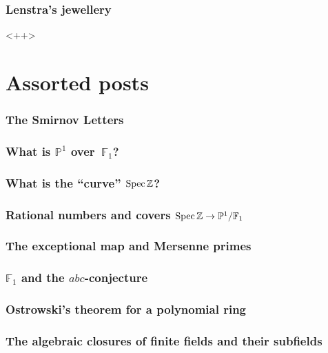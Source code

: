 \documentclass[a4paper]{memoir}
\begin{document}
\section{Lenstra's jewellery}<++>






\part{Assorted posts}

\setcounter{section}{0}

\section{The Smirnov Letters}

\section{What is $\mathbb{P}^1$ over~$\mathbb{F}_1$?}

\section{What is the ``curve'' $\operatorname{Spec}\mathbb{Z}$?}

\section{Rational numbers and covers $\operatorname{Spec}\mathbb{Z}\to\mathbb{P}^1/\mathbb{F}_1$}

\section{The exceptional map and Mersenne primes}

\section{$\mathbb{F}_1$ and the $abc$-conjecture}

\section{Ostrowski's theorem for a polynomial ring}

\section{The algebraic closures of finite fields and their subfields}
\end{document}
